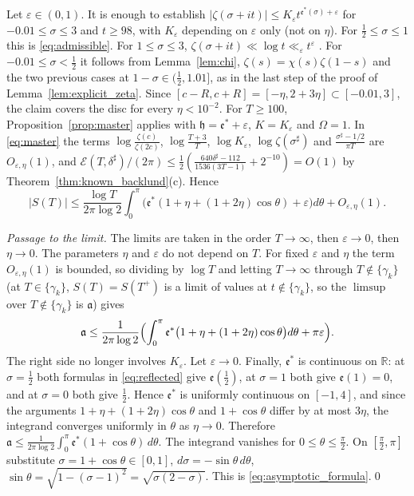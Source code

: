 \documentclass[11pt,a4paper]{article}
\makeatletter
\numberwithin{equation}{section}
\DeclareRobustCommand{\CGref}[1]{\ref{#1}}
\DeclareRobustCommand{\CGeqref}[1]{\eqref{#1}}
\DeclareRobustCommand{\CGcite}[2][]{\if\relax\detokenize{#1}\relax\cite{#2}\else\cite[#1]{#2}\fi}
\let\CG@origref\ref
\let\CG@origeqref\eqref
\newcommand{\CG@gettip}[1]{\@ifundefined{CGTip@#1}{#1}{\csname CGTip@#1\endcsname}}
\newcommand{\CG@getbib}[1]{\@ifundefined{CGBib@#1}{#1}{\csname CGBib@#1\endcsname}}
\DeclareRobustCommand{\CGref}[1]{\pdftooltip{\CG@origref{#1}}{\CG@gettip{#1}}}
\DeclareRobustCommand{\CGeqref}[1]{\pdftooltip{\CG@origeqref{#1}}{\CG@gettip{#1}}}
\DeclareRobustCommand{\CGcite}[2][]{\pdftooltip{\if\relax\detokenize{#1}\relax\cite{#2}\else\cite[#1]{#2}\fi}{\CG@getbib{#2}}}
\theoremstyle{definition}
\theoremstyle{remark}
\newcommand{\R}{\mathbb R}
\makeatother
\begin{document}
Let $\varepsilon\in(0,1)$. It is enough to establish $|\zeta(\sigma+it)|\le K_\varepsilon t^{\mathfrak e^*(\sigma)+\varepsilon}$ for $-0.01\le\sigma\le3$ and $t\ge98$, with $K_\varepsilon$ depending on $\varepsilon$ only (not on $\eta$). For $\frac12\le\sigma\le1$ this is \CGeqref{eq:admissible}. For $1\le\sigma\le3$, $\zeta(\sigma+it)\ll\log t\ll_\varepsilon t^\varepsilon$ \CGcite[Thm.~3.5]{Titchmarsh1986}. For $-0.01\le\sigma<\frac12$ it follows from Lemma~\CGref{lem:chi}, $\zeta(s)=\chi(s)\zeta(1-s)$ and the two previous cases at $1-\sigma\in(\frac12,1.01]$, as in the last step of the proof of Lemma~\CGref{lem:explicit_zeta}. Since $[c-R,c+R]=[-\eta,2+3\eta]\subset[-0.01,3]$, the claim covers the disc for every $\eta<10^{-2}$. For $T\ge100$, Proposition~\CGref{prop:master} applies with $\mathfrak h=\mathfrak e^*+\varepsilon$, $K=K_\varepsilon$ and $\Omega=1$. In \CGeqref{eq:master} the terms $\log\frac{\zeta(c)}{\zeta(2c)}$, $\log\frac{T+3}T$, $\log K_\varepsilon$, $\log\zeta(\sigma^\sharp)$ and $\frac{\sigma^\sharp-1/2}{\pi T}$ are $O_{\varepsilon,\eta}(1)$, and $\mathcal E(T,\delta^\sharp)/(2\pi)\le\frac12(\frac{640\delta^\sharp-112}{1536(3T-1)}+2^{-10})=O(1)$ by Theorem~\CGref{thm:known_backlund}(c). Hence
\begin{equation}
|S(T)|\le\frac{\log T}{2\pi\log2}\int_0^\pi\bigl(\mathfrak e^*(1+\eta+(1+2\eta)\cos\theta)+\varepsilon\bigr)d\theta+O_{\varepsilon,\eta}(1).
\label{eq:disp_15}
\end{equation}

\emph{Passage to the limit.} The limits are taken in the order $T\to\infty$, then $\varepsilon\to0$, then $\eta\to0$. The parameters $\eta$ and $\varepsilon$ do not depend on $T$. For fixed $\varepsilon$ and $\eta$ the term $O_{\varepsilon,\eta}(1)$ is bounded, so dividing by $\log T$ and letting $T\to\infty$ through $T\notin\{\gamma_k\}$ (at $T\in\{\gamma_k\}$, $S(T)=S(T^+)$ is a limit of values at $t\notin\{\gamma_k\}$, so the $\limsup$ over $T\notin\{\gamma_k\}$ is $\mathfrak a$) gives
\begin{equation}
\mathfrak a\le\frac1{2\pi\log2}\Bigl(\int_0^\pi\mathfrak e^*\bigl(1+\eta+(1+2\eta)\cos\theta\bigr)d\theta+\pi\varepsilon\Bigr).
\label{eq:disp_16}
\end{equation}
The right side no longer involves $K_\varepsilon$. Let $\varepsilon\to0$. Finally, $\mathfrak e^*$ is continuous on $\R$: at $\sigma=\frac12$ both formulas in \CGeqref{eq:reflected} give $\mathfrak e(\frac12)$, at $\sigma=1$ both give $\mathfrak e(1)=0$, and at $\sigma=0$ both give $\frac12$. Hence $\mathfrak e^*$ is uniformly continuous on $[-1,4]$, and since the arguments $1+\eta+(1+2\eta)\cos\theta$ and $1+\cos\theta$ differ by at most $3\eta$, the integrand converges uniformly in $\theta$ as $\eta\to0$. Therefore $\mathfrak a\le\frac1{2\pi\log2}\int_0^\pi\mathfrak e^*(1+\cos\theta)\,d\theta$. The integrand vanishes for $0\le\theta\le\frac\pi2$. On $[\frac\pi2,\pi]$ substitute $\sigma=1+\cos\theta\in[0,1]$, $d\sigma=-\sin\theta\,d\theta$, $\sin\theta=\sqrt{1-(\sigma-1)^2}=\sqrt{\sigma(2-\sigma)}$. This is \CGeqref{eq:asymptotic_formula}.\qed
\end{document}
